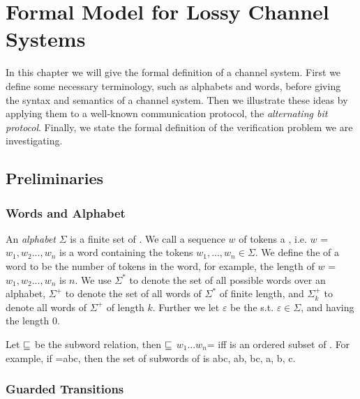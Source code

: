 \section{Formal Model for Lossy Channel Systems}
\label{definitions}
In this chapter we will give the formal definition of a channel system. First we define some necessary terminology, such as alphabets and words, before giving the syntax and semantics of a channel system. Then we illustrate these ideas by applying them to a well-known communication protocol, the \emph{alternating bit protocol}. Finally, we state the formal definition of the verification problem we are investigating.

\subsection{Preliminaries}
\subsubsection{Words and Alphabet}
An \emph{alphabet} $\Sigma$ is a finite set of . We call a sequence $w$ of tokens a , i.e. $w$ = $w_1, w_2..., w_n$ is a word containing the tokens $w_1,...,w_n \in \Sigma$. We define the  of a word to be the number of tokens in the word, for example, the length of $w$ = $w_1, w_2..., w_n$ is $n$. We use $\Sigma^*$ to denote the set of all possible words over an alphabet, $\Sigma^+$ to denote the set of all words of $\Sigma^*$ of finite length, and $\Sigma_k^+$ to denote all words of $\Sigma^+$ of length  $k$. Further we let $\varepsilon$ be the  s.t. $\varepsilon \in \Sigma$, and having the length 0.


Let $\sqsubseteq$ be the subword relation, then  $\sqsubseteq$ $w_1...w_n$= iff  is an ordered subset of . For example, if =abc, then the set of subwords of  is {abc, ab, bc, a, b, c}.

\subsubsection{Guarded Transitions}

